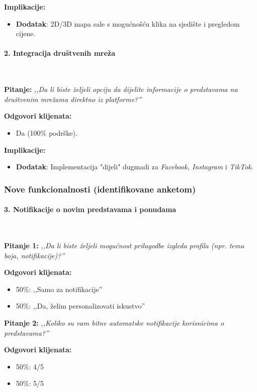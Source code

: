 \textbf{Implikacije:}  
\begin{itemize}  
    \item \textbf{Dodatak}: 2D/3D mapa sale s mogućnošću klika na sjedište i pregledom cijene.  
\end{itemize}  

\paragraph*{2. Integracija društvenih mreža}~


\textbf{Pitanje:}  
\emph{,,Da li biste željeli opciju da dijelite informacije o predstavama na društvenim mrežama direktno iz platforme?''}  

\textbf{Odgovori klijenata:}  
\begin{itemize}  
    \item Da (100\% podrške).  
\end{itemize}  

\textbf{Implikacije:}  
\begin{itemize}  
    \item \textbf{Dodatak}: Implementacija "dijeli" dugmadi za \emph{Facebook, Instagram} i \emph{TikTok}.  
\end{itemize}  

\subsubsection*{Nove funkcionalnosti (identifikovane anketom)}  

\paragraph*{3. Notifikacije o novim predstavama i ponudama}~


\textbf{Pitanje 1:}  
\emph{,,Da li biste željeli mogućnost prilagodbe izgleda profila (npr. tema boja, notifikacije)?''}  

\textbf{Odgovori klijenata:}  
\begin{itemize}  
    \item 50\%: ,,Samo za notifikacije''  
    \item 50\%: ,,Da, želim personalizovati iskustvo''  
\end{itemize}  

\textbf{Pitanje 2:}  
\emph{,,Koliko su vam bitne automatske notifikacije korisnicima o predstavama?''}  

\textbf{Odgovori klijenata:}  
\begin{itemize}  
    \item 50\%: 4/5  
    \item 50\%: 5/5  
\end{itemize}  

